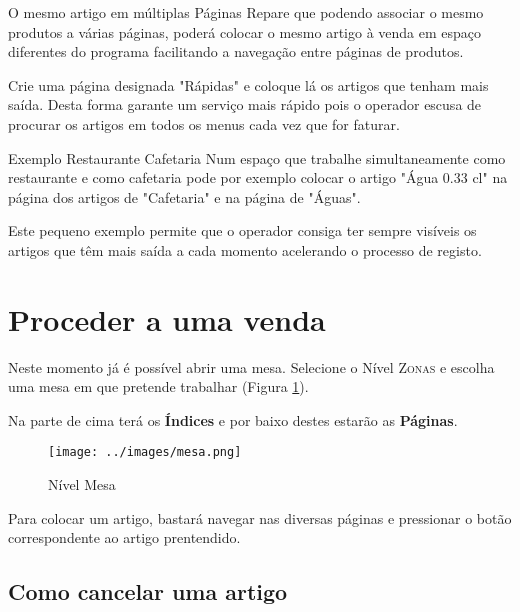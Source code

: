 \documentclass[a4paper,11pt,openany]{memoir}
\begin{document}
\begin{bclogo}[couleur=blue!10,arrondi=0.1,logo=\bclampe,ombre=true]{O mesmo artigo em múltiplas Páginas}
Repare que podendo associar o mesmo produtos a várias páginas, poderá colocar o mesmo artigo 
à venda em espaço diferentes do programa facilitando a navegação entre páginas de produtos.

Crie uma página designada "Rápidas" e coloque lá os artigos que tenham mais saída. Desta forma garante
um serviço mais rápido pois o operador escusa de procurar os artigos em todos os menus 
cada vez que for faturar.
\end{bclogo}

\begin{bclogo}[couleur=blue!10,arrondi=0.1,logo=\bccrayon,ombre=true]{Exemplo Restaurante Cafetaria}
Num espaço que trabalhe simultaneamente como restaurante e como cafetaria pode por exemplo colocar
o artigo "Água 0.33 cl" na página dos artigos de "Cafetaria" e na página de "Águas". 

Este pequeno exemplo permite que o operador consiga ter sempre visíveis os artigos que têm mais saída a 
cada momento acelerando o processo de registo. 
\end{bclogo}




\section{Proceder a uma venda}

Neste momento já é possível abrir uma mesa. Selecione o Nível \textsc{Zonas} e escolha uma mesa em que pretende trabalhar (Figura \ref{nivelMesa}).

Na parte de cima terá os \textbf{Índices} e por baixo destes estarão as \textbf{Páginas}.


\begin{figure}
\begin{center}
\texttt{[image: ../images/mesa.png]}
\caption[Submanifold]{Nível Mesa}
\label{nivelMesa}
\end{center}
\end{figure}



Para colocar um artigo, bastará navegar nas diversas páginas e pressionar o botão correspondente ao artigo prentendido.

\subsection{Como cancelar uma artigo}
\end{document}
